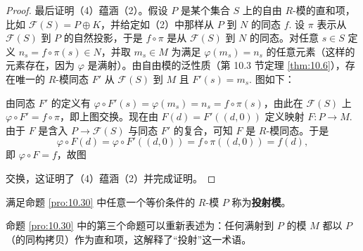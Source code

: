 \begin{proof}
最后证明（4）蕴涵（2）。假设 \(P\) 是某个集合 \(S\) 上的自由 \(R\)-模的直和项，比如 \(\mathcal{F}(S) = P \oplus K\)，并给定如（2）中那样从 \(P\) 到 \(N\) 的同态 \(f\). 设 \(\pi\) 表示从 \(\mathcal{F}(S)\) 到 \(P\) 的自然投影，于是 \(f \circ \pi\) 是从 \(\mathcal{F}(S)\) 到 \(N\) 的同态。对任意 \(s \in S\) 定义 \(n_s = f \circ \pi(s) \in N\)，并取 \(m_s \in M\) 为满足 \(\varphi(m_s) = n_s\) 的任意元素（这样的元素存在，因为 \(\varphi\) 是满射）。由自由模的泛性质（第 10.3 节定理 \ref{thm:10.6}），存在唯一的 \(R\)-模同态 \(F'\) 从 \(\mathcal{F}(S)\) 到 \(M\) 且 \(F'(s) = m_s\). 图如下：
\begin{center}\end{center}
由同态 \(F'\) 的定义有 \(\varphi \circ F'(s) = \varphi(m_s) = n_s = f \circ \pi(s)\)，由此在 \(\mathcal{F}(S)\) 上 \(\varphi \circ F' = f \circ \pi\)，即上图交换。现在由 \(F(d) = F'((d, 0))\) 定义映射 \(F : P \to M\). 由于 \(F\) 是含入 \(P \to \mathcal{F}(S)\) 与同态 \(F'\) 的复合，可知 \(F\) 是 \(R\)-模同态。于是
\[
\varphi \circ F(d) = \varphi \circ F'((d, 0)) = f \circ \pi((d, 0)) = f(d),
\]
即 \(\varphi \circ F = f\)，故图
\begin{center}\end{center}
交换，这证明了（4）蕴涵（2）并完成证明。
\end{proof}

\begin{definition}
满足命题 \ref{pro:10.30} 中任意一个等价条件的 \(R\)-模 \(P\) 称为\textbf{投射模}。
\end{definition}

命题 \ref{pro:10.30} 中的第三个命题可以重新表述为：任何满射到 \(P\) 的模 \(M\) 都以 \(P\)（的同构拷贝）作为直和项，这解释了“投射”这一术语。

